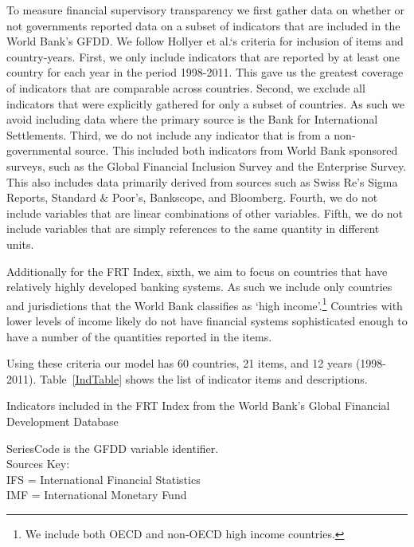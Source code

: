 \documentclass[a4paper]{article}
\begin{document}
To measure financial supervisory transparency we first gather data on whether or not governments reported data on a subset of indicators that are included in the World Bank's GFDD. We follow Hollyer et al.`s \citeyearpar{Hollyer2014} criteria for inclusion of items and country-years. First, we only include indicators that are reported by at least one country for each year in the period 1998-2011. This gave us the greatest coverage of indicators that are comparable across countries. Second, we exclude all indicators that were explicitly gathered for only a subset of countries. As such we avoid including data where the primary source is the Bank for International Settlements. Third, we do not include any indicator that is from a non-governmental source. This included both indicators from World Bank sponsored surveys, such as the Global Financial Inclusion Survey and the Enterprise Survey. This also includes data primarily derived from sources such as Swiss Re's Sigma Reports, Standard \& Poor's, Bankscope, and Bloomberg. Fourth, we do not include variables that are linear combinations of other variables. Fifth, we do not include variables that are simply references to the same quantity in different units. 

Additionally for the FRT Index, sixth, we aim to focus on countries that have relatively highly developed banking systems. As such we include only countries and jurisdictions that the World Bank classifies as `high income'.\footnote{We include both OECD and non-OECD high income countries.} Countries with lower levels of income likely do not have financial systems sophisticated enough to have a number of the quantities reported in the items. 

Using these criteria our model has 60 countries, 21 items, and 12 years (1998-2011). Table~\ref{IndTable} shows the list of indicator items and descriptions.  

\begin{table}[ht]
    \caption{Indicators included in the FRT Index from the World Bank's Global Financial Development Database}
    \label{IndTable}
    \vspace{0.3cm}
    \scalebox{0.95}{
        
    }
    {\scriptsize{SeriesCode is the GFDD variable identifier.\\
    Sources Key:\\ 
    IFS = International Financial Statistics\\
    IMF = International Monetary Fund}}
\end{table}
\end{document}
